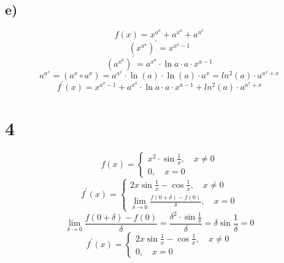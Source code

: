     \subsection*{e)}
    $$f(x) = x^{a^a} + a^{x^a} + a^{a^x}$$
    $$(x^{a^a})^{'} = x^{a^a-1}$$
    $$(a^{x^a})^{'} = a^{x^a}\cdot \ln{a}\cdot a\cdot x^{a-1}$$
    $$a^{a^x} = (a^x\circ a^x) = a^{a^x}\cdot\ln(a)\cdot\ln(a)\cdot a^x = ln^2(a)\cdot a^{a^x+x}$$
    $$f^{'}(x) =x^{a^a-1} +  a^{x^a}\cdot \ln{a}\cdot a\cdot x^{a-1} + ln^2(a)\cdot a^{a^x+x}$$
    \section*{4}
    $$f(x) = \begin{cases}
    	x^2\cdot\sin{\frac1x} ,\quad x\ne 0\\
    	0, \quad x=0
    \end{cases}$$
        $$f^{'}(x) = \begin{cases}
    	2x\sin{\frac1x}-\cos{\frac1x} ,\quad x\ne 0\\
    	\lim_{\delta\to 0}\frac{f(0+\delta)-f(0)}{\delta}, \quad x=0
    \end{cases}$$
    $$	\lim_{\delta\to 0}\frac{f(0+\delta)-f(0)}{\delta} = \frac{\delta^2\cdot\sin{\frac1\delta}}{\delta} = \delta\sin{\frac1\delta}= 0$$
            $$f^{'}(x) = \begin{cases}
    	2x\sin{\frac1x}-\cos{\frac1x} ,\quad x\ne 0\\
    	0, \quad x=0
    \end{cases}$$
